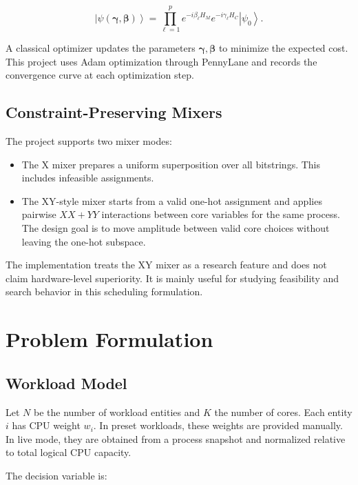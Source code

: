 \documentclass[12pt,a4paper,oneside]{report}
\begin{document}
\begin{equation}
  \left|\psi(\boldsymbol{\gamma}, \boldsymbol{\beta})\right\rangle =
  \prod_{\ell=1}^{p}
  e^{-i \beta_\ell H_M}
  e^{-i \gamma_\ell H_C}
  \left|\psi_0\right\rangle .
\end{equation}

A classical optimizer updates the parameters
\(\boldsymbol{\gamma}, \boldsymbol{\beta}\) to minimize the expected cost.
This project uses Adam optimization through PennyLane and records the
convergence curve at each optimization step.

\section{Constraint-Preserving Mixers}

The project supports two mixer modes:

\begin{itemize}
  \item The X mixer prepares a uniform superposition over all bitstrings. This
  includes infeasible assignments.
  \item The XY-style mixer starts from a valid one-hot assignment and applies
  pairwise \(XX + YY\) interactions between core variables for the same
  process. The design goal is to move amplitude between valid core choices
  without leaving the one-hot subspace.
\end{itemize}

The implementation treats the XY mixer as a research feature and does not claim
hardware-level superiority. It is mainly useful for studying feasibility and
search behavior in this scheduling formulation.

\chapter{Problem Formulation}
\label{chap:formulation}

\section{Workload Model}

Let \(N\) be the number of workload entities and \(K\) the number of cores. Each
entity \(i\) has CPU weight \(w_i\). In preset workloads, these weights are
provided manually. In live mode, they are obtained from a process snapshot and
normalized relative to total logical CPU capacity.

The decision variable is:
\end{document}
